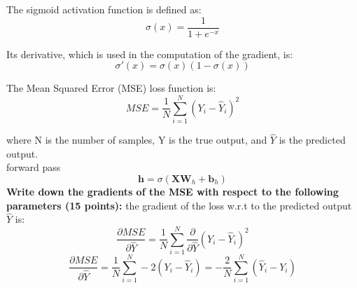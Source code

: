 \documentclass{article}
\begin{document}
The sigmoid activation function is defined as:
\[
\sigma(x) = \frac{1}{1 + e^{-x}}
\]

Its derivative, which is used in the computation of the gradient, is:
\[
\sigma'(x) = \sigma(x)(1 - \sigma(x))
\]

The Mean Squared Error (MSE) loss function is:
\[
MSE = \frac{1}{N} \sum_{i=1}^{N} (Y_i - \hat{Y}_i)^2
\]

where N is the number of samples, Y is the true output, and \(\hat{Y}\) is the predicted output.
\\ forward pass
\[
\mathbf{h} = \sigma(\mathbf{X} \mathbf{W}_h + \mathbf{b}_h)
\]
\textbf{Write down the gradients of the MSE with respect to the following parameters (15 points):}
the gradient of the loss w.r.t to the predicted output $\hat{Y}$ is:
\[
\frac{\partial MSE}{\partial \hat{Y}} = \frac{1}{N} \sum_{i=1}^{N} \frac{\partial}{\partial \hat{Y}} (Y_i - \hat{Y}_i)^2
\]
\[
\frac{\partial MSE}{\partial \hat{Y}} = \frac{1}{N} \sum_{i=1}^{N} -2(Y_i - \hat{Y}_i) = -\frac{2}{N} \sum_{i=1}^{N} (\hat{Y}_i - Y_i)
\]
\end{document}
